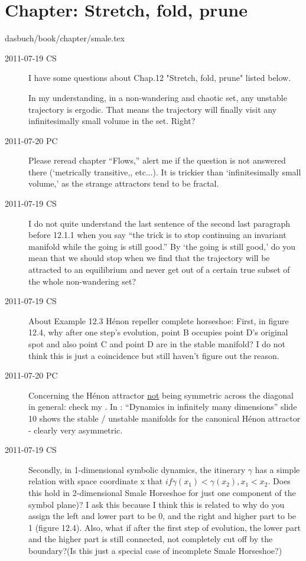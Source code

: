 \section{Chapter: Stretch, fold, prune}\noindent dasbuch/book/chapter/smale.tex
\begin{description}

\item[2011-07-19 CS]
I have some questions about Chap.12 "Stretch, fold, prune" listed below.

In my understanding, in a non-wandering and chaotic set, any unstable
trajectory is ergodic. That means the trajectory will finally visit any
infinitesimally small volume in the set. Right?

\item[2011-07-20 PC]                                        \toCB
Please reread chapter ``Flows,'' alert me if the question is not answered
there (`metrically transitive,, etc...). It is trickier than
`infinitesimally small volume,' as the strange attractors tend to be
fractal.

\item[2011-07-19 CS]
I do not quite understand the last sentence of the second last paragraph
before 12.1.1 when you say ``the trick is to stop continuing an invariant
manifold while the going is still good.'' By `the going is still good,' do
you mean that we should stop when we find that the trajectory will be
attracted to an equilibrium and never get out of a certain true subset of
the whole non-wandering set?

\item[2011-07-19 CS]
About Example 12.3 H\'enon repeller complete horseshoe:
First, in figure 12.4, why after one step's evolution, point B occupies
point D's original spot and also point C and point D are in the stable
manifold? I do not think this is just a coincidence but still haven't
figure out the reason.

\item[2011-07-20 PC]                                        \toCB
Concerning the H\'enon attractor \underline{not} being symmetric across
the diagonal in general: check my
.
In : ``Dynamics in infinitely many dimensions'' slide 10 shows the
stable / unstable manifolds for the canonical H\'enon attractor - clearly
very asymmetric.

\item[2011-07-19 CS]
Secondly, in 1-dimensional symbolic dynamics, the itinerary $\gamma$ has a
simple relation with space coordinate x that $if \gamma(x_1) <
\gamma(x_2), x_1<x_2$. Does this hold in 2-dimensional Smale Horseshoe
for just one component of the symbol plane)? I ask this because I think
this is related to why do you assign the left and lower part to be 0, and
the right and higher part to be 1 (figure 12.4). Also, what if after the
first step of evolution, the lower part and the higher part is still
connected, not completely cut off by the boundary?(Is this just a special
case of incomplete Smale Horseshoe?)


\end{description}
